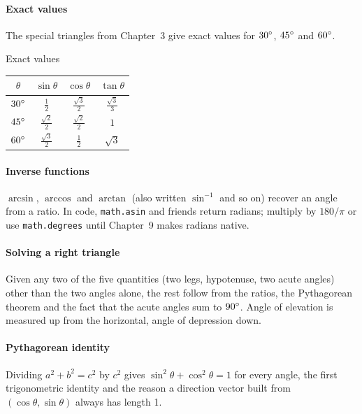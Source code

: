 \paragraph{Exact values} The special triangles from Chapter~3 give exact values for $30^\circ$, $45^\circ$ and $60^\circ$.

\begin{keybox}{Exact values}
\begin{center}
\renewcommand{\arraystretch}{1.4}
\begin{tabular}{c c c c}
\toprule
$\theta$ & $\sin\theta$ & $\cos\theta$ & $\tan\theta$ \\
\midrule
$30^\circ$ & $\tfrac{1}{2}$ & $\tfrac{\sqrt{3}}{2}$ & $\tfrac{\sqrt{3}}{3}$ \\
$45^\circ$ & $\tfrac{\sqrt{2}}{2}$ & $\tfrac{\sqrt{2}}{2}$ & $1$ \\
$60^\circ$ & $\tfrac{\sqrt{3}}{2}$ & $\tfrac{1}{2}$ & $\sqrt{3}$ \\
\bottomrule
\end{tabular}
\end{center}
\end{keybox}

\paragraph{Inverse functions} $\arcsin$, $\arccos$ and $\arctan$ (also written $\sin^{-1}$ and so on) recover an angle from a ratio. In code, \lstinline!math.asin! and friends return radians; multiply by $180/\pi$ or use \lstinline!math.degrees! until Chapter~9 makes radians native.

\paragraph{Solving a right triangle} Given any two of the five quantities (two legs, hypotenuse, two acute angles) other than the two angles alone, the rest follow from the ratios, the Pythagorean theorem and the fact that the acute angles sum to $90^\circ$. Angle of elevation is measured up from the horizontal, angle of depression down.

\paragraph{Pythagorean identity} Dividing $a^2 + b^2 = c^2$ by $c^2$ gives $\sin^2\theta + \cos^2\theta = 1$ for every angle, the first trigonometric identity and the reason a direction vector built from $(\cos\theta, \sin\theta)$ always has length 1.


